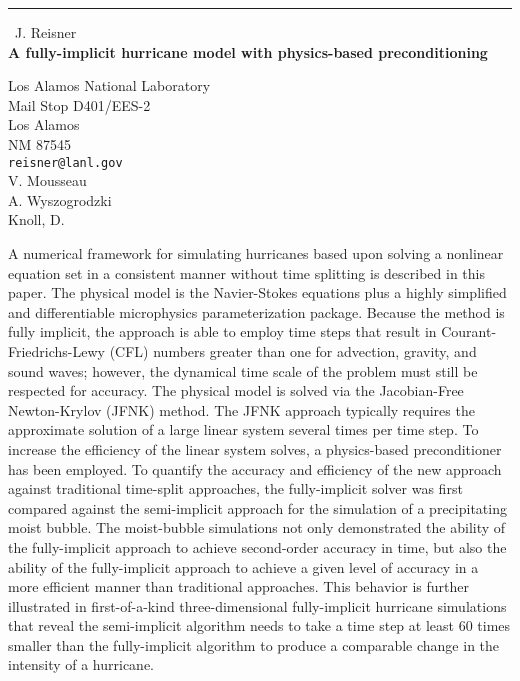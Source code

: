 \documentclass{report}
\begin{document}
\begin{center}
\rule{6in}{1pt} \
{\large J. Reisner \\
{\bf A fully-implicit hurricane model with physics-based preconditioning}}

Los Alamos National Laboratory \\ Mail Stop D401/EES-2 \\ Los Alamos \\ NM 87545
\\
{\tt reisner@lanl.gov}\\
V. Mousseau\\
A. Wyszogrodzki\\
	Knoll, D.\end{center}

A numerical framework for simulating hurricanes based
upon solving a nonlinear equation set in a consistent
manner without time splitting is described in this
paper. The physical model is the Navier-Stokes
equations plus a highly simplified and differentiable
microphysics parameterization package. Because the
method is fully implicit, the approach is able to
employ time steps that result in
Courant-Friedrichs-Lewy (CFL) numbers greater than one
for advection, gravity, and sound waves; however, the
dynamical time scale of the problem must still be
respected for accuracy. The physical model is solved
via the Jacobian-Free Newton-Krylov (JFNK) method. The
JFNK approach typically requires the approximate
solution of a large linear system several times per
time step. To increase the efficiency of the linear
system solves, a physics-based preconditioner has been
employed. To quantify the accuracy and efficiency of
the new approach against traditional time-split
approaches, the fully-implicit solver was first
compared against the semi-implicit approach for the
simulation of a precipitating moist bubble. The
moist-bubble simulations not only demonstrated the
ability of the fully-implicit approach to achieve
second-order accuracy in time, but also the ability of
the fully-implicit approach to achieve a given level of
accuracy in a more efficient manner than traditional
approaches. This behavior is further illustrated in
first-of-a-kind three-dimensional fully-implicit
hurricane simulations that reveal the semi-implicit
algorithm needs to take a time step at least 60 times
smaller than the fully-implicit algorithm to produce a
comparable change in the intensity of a hurricane.
\end{document}
